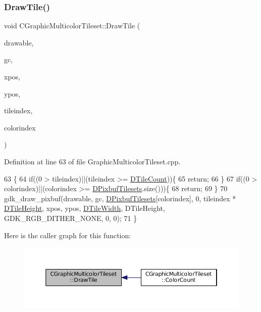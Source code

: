 \subsubsection{\texorpdfstring{Draw\+Tile()}{DrawTile()}}
{\footnotesize\ttfamily void C\+Graphic\+Multicolor\+Tileset\+::\+Draw\+Tile (\begin{DoxyParamCaption}\item[{Gdk\+Drawable $\ast$}]{drawable,  }\item[{Gdk\+GC $\ast$}]{gc,  }\item[{gint}]{xpos,  }\item[{gint}]{ypos,  }\item[{int}]{tileindex,  }\item[{int}]{colorindex }\end{DoxyParamCaption})}



Definition at line 63 of file Graphic\+Multicolor\+Tileset.\+cpp.


\begin{DoxyCode}
63                                                                                                            
                        \{
64     \textcolor{keywordflow}{if}((0 > tileindex)||(tileindex >= \hyperlink{classCGraphicTileset_a39d942b370e47f441bf97385eb1037c8}{DTileCount}))\{
65         \textcolor{keywordflow}{return};
66     \}
67     \textcolor{keywordflow}{if}((0 > colorindex)||(colorindex >= \hyperlink{classCGraphicMulticolorTileset_a30809d113b0f314944425a3c8f21408c}{DPixbufTilesets}.size()))\{
68         \textcolor{keywordflow}{return};    
69     \}
70     gdk\_draw\_pixbuf(drawable, gc, \hyperlink{classCGraphicMulticolorTileset_a30809d113b0f314944425a3c8f21408c}{DPixbufTilesets}[colorindex], 0, tileindex * 
      \hyperlink{classCGraphicTileset_af48f32e07d5fe69afd5f764318cc3244}{DTileHeight}, xpos, ypos, \hyperlink{classCGraphicTileset_a2d0c7d19865b81911a3a43d5cae50e00}{DTileWidth}, DTileHeight, GDK\_RGB\_DITHER\_NONE, 0, 0);
71 \}
\end{DoxyCode}
Here is the caller graph for this function\+:
\nopagebreak
\begin{figure}[H]
\begin{center}
\leavevmode
\includegraphics[width=350pt]{classCGraphicMulticolorTileset_a17ee648ac82c48079a1853dc8a10365a_icgraph}
\end{center}
\end{figure}
\hypertarget{classCGraphicMulticolorTileset_a6ab975d5bc2ba0ed892de03bba9242cc}{}\label{classCGraphicMulticolorTileset_a6ab975d5bc2ba0ed892de03bba9242cc} 
